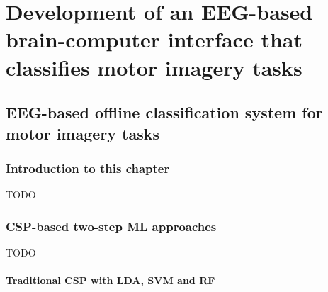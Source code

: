 





\part{Development of an EEG-based brain-computer interface that classifies motor imagery tasks}
\label{part:development}

\chapter{EEG-based offline classification system for motor imagery tasks}
\label{ch:offline_bci_system}

\section{Introduction to this chapter}
\label{sec:offline_bci_system_introduction}

TODO

\section{CSP-based two-step ML approaches}
\label{sec:offline_bci_system_two_step_ml}

TODO


\subsection{Traditional CSP with LDA, SVM and RF}
\label{subsec:offline_bci_system_two_step_ml_basic_csp}

